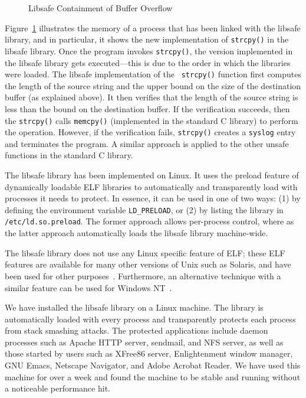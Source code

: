 \documentclass[]{article}
\begin{document}
\begin{figure}[tbp]
\centerline{}
\caption{Libsafe Containment of Buffer Overflow}
\label{fig:intercept}
\end{figure}

Figure~\ref{fig:intercept} illustrates the memory of a process that
has been linked with the libsafe library, and in particular, it shows
the new implementation of {\tt strcpy()} in the libsafe library.  Once
the program invokes {\tt strcpy()}, the version implemented in the
libsafe library gets executed---this is due to the order in which the
libraries were loaded.  The libsafe implementation of the {\tt
strcpy()} function first computes the length of the source string and
the upper bound on the size of the destination buffer (as explained
above).  It then verifies that the length of the source string is less
than the bound on the destination buffer.  If the verification
succeeds, then the {\tt strcpy()} calls {\tt memcpy()} (implemented in
the standard C library) to perform the operation.  However, if the
verification fails, {\tt strcpy()} creates a {\tt syslog} entry and
terminates the program.  A similar approach is applied to the other
unsafe functions in the standard C library.

The libsafe library has been implemented on Linux.  It uses the
preload feature of dynamically loadable ELF libraries to automatically
and transparently load with processes it needs to protect.  In
essence, it can be used in one of two ways: (1) by defining the
environment variable {\tt LD\_PRELOAD}, or (2) by listing the library
in {\tt /etc/ld.so.preload}.  The former approach allows per-process
control, where as the latter approach automatically loads the libsafe
library machine-wide.

The libsafe library does not use any Linux specific feature of ELF; these ELF
features are available for many other versions of Unix such as Solaris, and
have been used for other purposes~\cite{Alexandrov:1997:EOS,zlibc}.
Furthermore, an alternative technique with a similar feature can be used for
Windows NT~\cite{mediating_connectors,sosp93*80}.

We have installed the libsafe library on a Linux machine.  The library is
automatically loaded with every process and transparently protects each process
from stack smashing attacks.  The protected applications include daemon
processes such as Apache HTTP server, sendmail, and NFS server, as well as
those started by users such as XFree86 server, Enlightenment window manager,
GNU Emacs, Netscape Navigator, and Adobe Acrobat Reader.  We have used this
machine for over a week and found the machine to be stable and running without
a noticeable performance hit.
\end{document}

